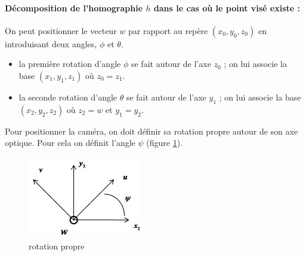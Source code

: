 \paragraph{Décomposition de l'homographie $h$ dans le cas où le point visé existe :}
On peut positionner le vecteur $w$ par rapport au repère $(x_{0},y_{0},z_{0}) $ en introduisant deux angles, $\phi$ et $\theta$.
\begin{itemize}
\item la première rotation d'angle $\phi$ se fait autour de l'axe $z_{0}$ ; on lui associe la base $(x_{1},y_{1},z_{1})$ où $z_{0}=z_{1}$.
\item la seconde rotation d'angle $\theta$ se fait autour de l'axe $y_{1}$ ; on lui associe la base $(x_{2},y_{2},z_{2})$ où $z_{2}=w$ et $y_{1}=y_{2}$.
\end{itemize}
\begin{figure}[h!]
\centering
{}
\end{figure}

Pour positionner la caméra, on doit définir sa rotation propre autour de son axe optique. Pour cela on définit l'angle $\psi$ (figure \ref{decompositionGeometrique_rotationPropre}).
\begin{figure}[h!]
\centering
\includegraphics[width=5cm]{graphe3.jpg}
\caption{rotation propre}
\label{decompositionGeometrique_rotationPropre}
\end{figure}

